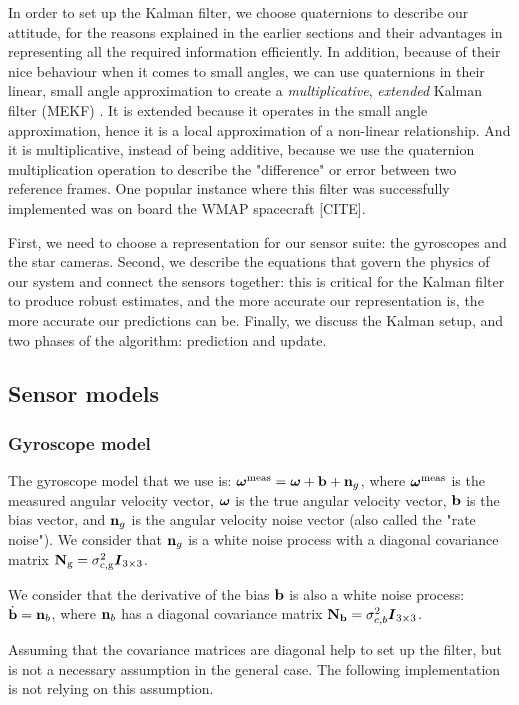 In order to set up the Kalman filter, we choose quaternions to describe our attitude, for the reasons explained in the earlier sections and their advantages in representing all the required information efficiently. In addition, because of their nice behaviour when it comes to small angles, we can use quaternions in their linear, small angle approximation to create a \textit{multiplicative}, \textit{extended} Kalman filter (MEKF) \citep{Lefferts:1982dx}. It is extended because it operates in the small angle approximation, hence it is a local approximation of a non-linear relationship. And it is multiplicative, instead of being additive, because we use the quaternion multiplication operation to describe the "difference" or error between two reference frames. One popular instance where this filter was successfully implemented was on board the WMAP spacecraft [CITE].

First, we need to choose a representation for our sensor suite: the gyroscopes and the star cameras. Second, we describe the equations that govern the physics of our system and connect the sensors together: this is critical for the Kalman filter to produce robust estimates, and the more accurate our representation is, the more accurate our predictions can be. Finally, we discuss the Kalman setup, and two phases of the algorithm: prediction and update.

\subsection{Sensor models}
\label{sec:SensorModels}
\subsubsection{Gyroscope model}

The gyroscope model that we use is: $\boldsymbol\omega^\textrm{meas}  =  \boldsymbol\omega + \textrm{\textbf{b}} + \textbf{n}_g$, where $\boldsymbol\omega^\textrm{meas}$ is the measured angular velocity vector, $\boldsymbol\omega$ is the true angular velocity vector, $\textrm{\textbf{b}}$ is the bias vector, and $\textbf{n}_g$ is the angular velocity noise vector (also called the "rate noise"). We consider that $\textbf{n}_g$ is a white noise process with a diagonal covariance matrix $\textrm{\textbf{N}}_{\textrm{g}} = \sigma_{c,\textrm{g}}^2\boldsymbol{I}_{3\times 3}$. 

We consider that the derivative of the bias $\textrm{\textbf{b}}$ is also a white noise process: $\dot{\textrm{\textbf{b}}} = \textbf{n}_b$, where $\textbf{n}_b$ has a diagonal covariance matrix $\textrm{\textbf{N}}_{\textrm{\textbf{b}}} = \sigma_{c,b}^2\boldsymbol{I}_{3\times 3}$.

Assuming that the covariance matrices are diagonal help to set up the filter, but is not a necessary assumption in the general case. The following implementation is not relying on this assumption.

